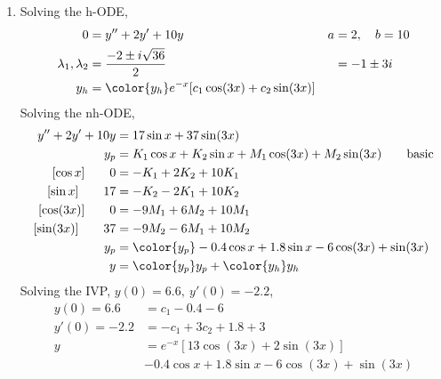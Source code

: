 \begin{enumerate}
    \item Solving the h-ODE,
          \begin{align}
              0                        & = y'' + 2y' + 10y                                   & a & = 2, \quad b = 10 \\
              \lambda_{1}, \lambda_{2} & = \frac{-2 \pm i\sqrt{36}}{2}                       &   & = -1 \pm 3i       \\
              y_{h}                    & = \color{y_h} e^{-x}[c_{1}\cos(3x) + c_{2}\sin(3x)]
          \end{align}
          Solving the nh-ODE,
          \begin{align}
              y'' + 2y' + 10y      & = 17\sin x + 37\sin(3x)                                                         \\
              y_{p}                & = K_{1}\cos x + K_{2}\sin x + M_{1}\cos(3x) + M_{2}\sin(3x) \qquad \text{basic} \\
              [\cos x] \qquad 0    & = -K_{1} + 2K_{2} + 10K_{1}                                                     \\
              [\sin x] \qquad 17   & = -K_{2} - 2K_{1} + 10K_{2}                                                     \\
              [\cos(3x)] \qquad 0  & = -9M_{1} + 6M_{2} + 10M_{1}                                                    \\
              [\sin(3x)] \qquad 37 & = -9M_{2} - 6M_{1} + 10M_{2}                                                    \\
              y_{p}                & = \color{y_p} -0.4\cos x + 1.8\sin x - 6\cos(3x) + \sin(3x)                     \\
              y                    & = {\color{y_p} y_{p}} + {\color{y_h} y_{h}}
          \end{align}
          Solving the IVP, $ y(0) = 6.6,\ y'(0) = -2.2 $,
          \begin{align}
              y(0) = 6.6   & = c_{1} - 0.4 - 6                             \\
              y'(0) = -2.2 & = -c_{1} + 3c_{2} + 1.8 + 3                   \\
              y            & = e^{-x}[13 \cos(3x) + 2\sin(3x)]             \\
                           & -0.4\cos x + 1.8\sin x - 6\cos(3x) + \sin(3x)
          \end{align}


\end{enumerate}
